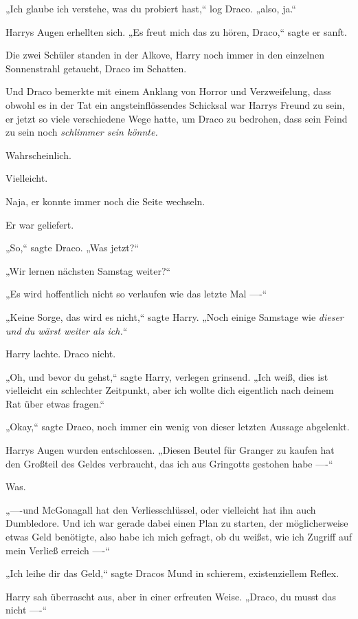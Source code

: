 {„Ich glaube ich verstehe, was du probiert hast,“ log Draco. „also, ja.“

Harrys Augen erhellten sich. „Es freut mich das zu hören, Draco,“ sagte er sanft.

Die zwei Schüler standen in der Alkove, Harry noch immer in den einzelnen Sonnenstrahl getaucht, Draco im Schatten.

Und Draco bemerkte mit einem Anklang von Horror und Verzweifelung, dass obwohl es in der Tat ein angsteinflössendes Schicksal war Harrys Freund zu sein, er jetzt so viele verschiedene Wege hatte, um Draco zu bedrohen, dass sein Feind zu sein noch \emph{schlimmer sein könnte.}

Wahrscheinlich.

Vielleicht.

Naja, er konnte immer noch die Seite wechseln.

Er war geliefert.

„So,“ sagte Draco. „Was jetzt?“

„Wir lernen nächsten Samstag weiter?“

„Es wird hoffentlich nicht so verlaufen wie das letzte Mal ----“

„Keine Sorge, das wird es nicht,“ sagte Harry. „Noch einige Samstage wie \emph{dieser und du wärst weiter als \emph{ich}.“}

Harry lachte. Draco nicht.

„Oh, und bevor du gehst,“ sagte Harry, verlegen grinsend. „Ich weiß, dies ist vielleicht ein schlechter Zeitpunkt, aber ich wollte dich eigentlich nach deinem Rat über etwas fragen.“

„Okay,“ sagte Draco, noch immer ein wenig von dieser letzten Aussage abgelenkt.

Harrys Augen wurden entschlossen. „Diesen Beutel für Granger zu kaufen hat den Großteil des Geldes verbraucht, das ich aus Gringotts gestohen habe ----“

Was.

„----und McGonagall hat den Verliesschlüssel, oder vielleicht hat ihn auch Dumbledore. Und ich war gerade dabei einen Plan zu starten, der möglicherweise etwas Geld benötigte, also habe ich mich gefragt, ob du weißst, wie ich Zugriff auf mein Verließ erreich ----“

„Ich leihe dir das Geld,“ sagte Dracos Mund in schierem, existenziellem Reflex.

Harry sah überrascht aus, aber in einer erfreuten Weise. „Draco, du musst das nicht ----“

}
